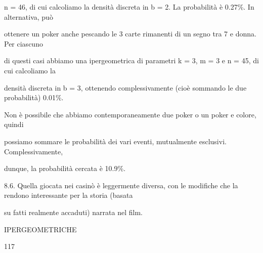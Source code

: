 \documentclass[a4paper,portrait,12pt]{article}
\begin{document}
\begin{flushleft}
n = 46, di cui calcoliamo la densit\`{a} discreta in b = 2. La probabilit\`{a} \`{e} 0.27\%. In alternativa, pu\`{o}
\end{flushleft}


\begin{flushleft}
ottenere un poker anche pescando le 3 carte rimanenti di un segno tra 7 e donna. Per ciascuno
\end{flushleft}


\begin{flushleft}
di questi casi abbiamo una ipergeometrica di parametri k = 3, m = 3 e n = 45, di cui calcoliamo la
\end{flushleft}


\begin{flushleft}
densit\`{a} discreta in b = 3, ottenendo complessivamente (cio\`{e} sommando le due probabilit\`{a}) 0.01\%.
\end{flushleft}


\begin{flushleft}
Non \`{e} possibile che abbiamo contemporaneamente due poker o un poker e colore, quindi
\end{flushleft}


\begin{flushleft}
possiamo sommare le probabilit\`{a} dei vari eventi, mutualmente esclusivi. Complessivamente,
\end{flushleft}


\begin{flushleft}
dunque, la probabilit\`{a} cercata \`{e} 10.9\%.
\end{flushleft}


\begin{flushleft}
8.6. Quella giocata nei casin\`{o} \`{e} leggermente diversa, con le modifiche che la rendono interessante per la storia (basata
\end{flushleft}


\begin{flushleft}
su fatti realmente accaduti) narrata nel film.
\end{flushleft}





\begin{flushleft}
 IPERGEOMETRICHE
\end{flushleft}





117
\end{document}
